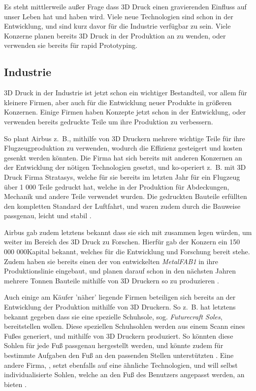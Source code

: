 Es steht mittlerweile außer Frage dass 3D Druck einen gravierenden Einfluss auf unser Leben hat und haben wird. Viele neue Technologien sind schon in der Entwicklung, und sind kurz davor für die Industrie verfügbar zu sein. Viele Konzerne planen bereits 3D Druck in der Produktion an zu wenden, oder verwenden sie bereits für rapid Prototyping.


\subsection{Industrie}

3D Druck in der Industrie ist jetzt schon ein wichtiger Bestandteil, vor allem für kleinere Firmen, aber auch für die Entwicklung neuer Produkte in größeren Konzernen. Einige Firmen haben Konzepte jetzt schon in der Entwicklung, oder verwenden bereits gedruckte Teile um ihre Produktion zu verbessern.

So plant Airbus z.~B., mithilfe von 3D Druckern mehrere wichtige Teile für ihre Flugzeugproduktion zu verwenden, wodurch die Effizienz gesteigert und kosten gesenkt werden könnten. Die Firma hat sich bereits mit anderen Konzernen an der Entwicklung der nötigen Technologien gesetzt, und ko-operiert z.~B. mit 3D Druck Firma Stratasys, welche für sie bereits im letzten Jahr für ein Flugzeug über 1 000 Teile gedruckt hat, welche in der Produktion für Abdeckungen, Mechanik und andere Teile verwendet wurden. Die gedruckten Bauteile erfüllten den kompletten Standard der Luftfahrt, und waren zudem durch die Bauweise passgenau, leicht und stabil \parencite{1000_PART_PLANE}.

Airbus gab zudem letztens bekannt dass sie sich mit  zusammen legen würden, um weiter im Bereich des 3D Druck zu Forschen. Hierfür gab der Konzern ein 150 000 000\EURO Kapital bekannt, welches für die Entwicklung und Forschung bereit stehe. Zudem haben sie bereits einen der von  entwickelten \emph{MetalFAB1} in ihre Produktionslinie eingebaut, und planen darauf schon in den nächsten Jahren mehrere Tonnen Bauteile mithilfe von 3D Druckern so zu produzieren \parencite{AIRBUS_METALFAB}.

Auch einige am Käufer 'näher' liegende Firmen beteiligen sich bereits an der Entwicklung der Produktion mithilfe von 3D Druckern.
So z.~B. hat  letztens bekannt gegeben dass sie eine spezielle Schuhsole, sog. \emph{Futurecraft Soles}, bereitstellen wollen. Diese speziellen Schuhsohlen werden aus einem Scann eines Fußes generiert, und mithilfe von 3D Druckern produziert. So könnten diese Sohlen für jede Fuß passgenau hergestellt werden, und könnte zudem für bestimmte Aufgaben den Fuß an den passenden Stellen unterstützten \parencite{ADIDAS}. Eine andere Firma, , setzt ebenfalls auf eine ähnliche Technologien, und will selbst individualisierte Sohlen, welche an den Fuß des Benutzers angepasst werden, an bieten \parencite{NEW_BALANCE}.

